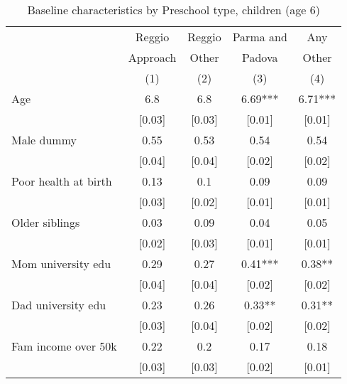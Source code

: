 \begin{table}[H]
\caption{Baseline characteristics by Preschool type, children (age 6)}
\label{tab:child_CONTROLmaterna}
\centering
\small
\begin{tabular}{l cccc}
\hline \hline 
 & Reggio & Reggio & Parma and & Any \\
 & Approach & Other & Padova & Other \\
 &   (1)    &  (2)  & (3)    &  (4) \\
\hline 

Age & 6.8 & 6.8 & 6.69*** & 6.71*** \\
 & [0.03] & [0.03] & [0.01] & [0.01] \\
Male dummy & 0.55 & 0.53 & 0.54 & 0.54 \\
 & [0.04] & [0.04] & [0.02] & [0.02] \\
Poor health at birth & 0.13 & 0.1 & 0.09 & 0.09 \\
 & [0.03] & [0.02] & [0.01] & [0.01] \\
Older siblings  & 0.03 & 0.09 & 0.04 & 0.05 \\
 & [0.02] & [0.03] & [0.01] & [0.01] \\
Mom university edu  & 0.29 & 0.27 & 0.41*** & 0.38** \\
 & [0.04] & [0.04] & [0.02] & [0.02] \\
Dad university edu  & 0.23 & 0.26 & 0.33** & 0.31** \\
 & [0.03] & [0.04] & [0.02] & [0.02] \\
Fam income over 50k  & 0.22 & 0.2 & 0.17 & 0.18 \\
 & [0.03] & [0.03] & [0.02] & [0.01] \\

\end{tabular}
\end{table}
